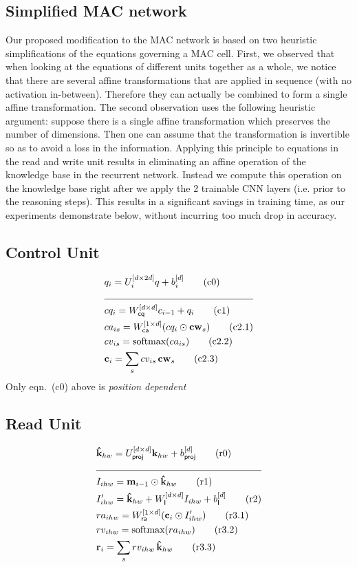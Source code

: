\subsection{Simplified MAC network}
Our proposed modification to the MAC network is based on two heuristic
simplifications of the equations governing a MAC cell. 
First, we observed that when looking at the equations of different units
together as a whole, we notice that there are several affine transformations
that are applied in sequence (with no activation in-between).
Therefore they can actually be combined to form a single affine transformation.
The second observation uses the following heuristic argument:
suppose there is a single affine transformation which preserves the number
of dimensions. Then one can assume that the transformation is invertible
so as to avoid a loss in the information. Applying this principle to 
equations in the read and write unit results in eliminating an affine
operation of the knowledge base in the recurrent network. Instead we compute
this operation on the knowledge base right after we apply the 2 
trainable CNN layers (i.e. prior to the reasoning steps). This results
in a significant savings in training time, as our experiments demonstrate
below, without incurring too much drop in accuracy.

\subsection*{Control Unit}

\begin{align*}
	&q_i = U_i^{[d \times 2d]} q + b_i^{[d]}  \tag{c0} \\
	\cline{1-2}
	&cq_i = W_{\textsf{cq}}^{[d \times d]} c_{i-1} + q_i  \tag{c1} \\
	&ca_{is} = W_{\textsf{ca}}^{[1 \times d]} (cq_i \odot \mathbf{cw}_s)  \tag{c2.1}\\
	&cv_{is} = \textrm{softmax}(ca_{is}) \tag{c2.2}\\
	&\mathbf{c}_i = \sum_s cv_{is} \, \mathbf{cw}_s  \tag{c2.3}
\end{align*}
Only eqn.~(c0) above is \emph{position dependent}

\subsection*{Read Unit}

\begin{align*}
	&\mathbf{\tk}_{hw} = U_{\textsf{proj}}^{[d \times d]} \mathbf{k}_{hw} + b_{\textsf{proj}}^{[d]} \tag{r0} \\
	\cline{1-2}
	&I_{ihw} = \mathbf{m}_{i-1} \odot \mathbf{\tk}_{hw} \tag{r1} \\
	&I'_{ihw} = \mathbf{\tk}_{hw}  + W_{\textsf{I}}^{[d \times d]} I_{ihw} + b_{\textsf{I}}^{[d]}  \tag{r2} \\
	&ra_{ihw} = W_{\textsf{ra}}^{[1 \times d]} (\mathbf{c}_i \odot I'_{ihw})  \tag{r3.1}\\
	&rv_{ihw} = \textrm{softmax}(ra_{ihw}) \tag{r3.2}\\
	&\mathbf{r}_i = \sum_s rv_{ihw} \, \mathbf{\tk}_{hw}  \tag{r3.3}
\end{align*}

